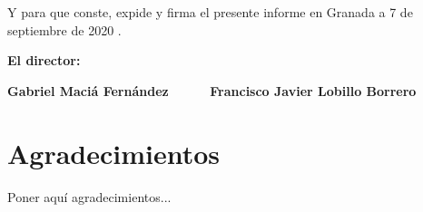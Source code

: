 Y para que conste, expide y firma el presente informe en Granada a 7 de septiembre de 2020 .

\vspace{1cm}

\textbf{El director:}

\vspace{5cm}

\noindent \textbf{Gabriel Maciá Fernández \ \ \ \ \ Francisco Javier Lobillo Borrero}

\chapter*{Agradecimientos}
\thispagestyle{empty}

       \vspace{1cm}


Poner aquí agradecimientos...

